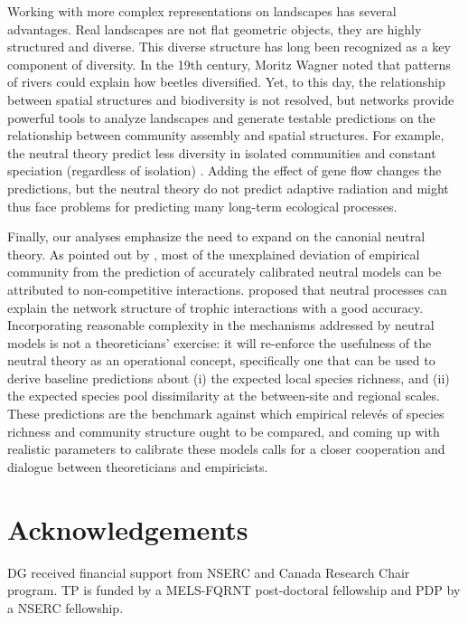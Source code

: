 \documentclass[12pt]{article}
\begin{document}
Working with more complex representations on landscapes has several advantages.
Real landscapes are not flat geometric objects, they are highly structured and
diverse. This diverse structure has long been recognized as a key component of
diversity. In the 19th century, Moritz Wagner noted that patterns of rivers
\cite{coy04} could explain how beetles diversified. Yet, to this day, the
relationship between spatial structures and biodiversity is not resolved, but
networks provide powerful tools to analyze landscapes and generate testable
predictions on the relationship between community assembly and spatial
structures. For example, the neutral theory predict less diversity in isolated
communities and constant speciation (regardless of isolation) \cite{eco08}.
Adding the effect of gene flow changes the predictions, but the neutral theory
do not predict adaptive radiation and might thus face problems for predicting
many long-term ecological processes.

Finally, our analyses emphasize the need to expand on the canonial neutral
theory. As pointed out by \textcite{Wootoon2005}, most of the unexplained
deviation of empirical community from the prediction of accurately calibrated
neutral models can be attributed to non-competitive interactions. \textcite{Canard2012}
proposed that neutral processes can explain the network structure of trophic
interactions with a good accuracy. Incorporating reasonable complexity in the
mechanisms addressed by neutral models is not a theoreticians' exercise: it will
re-enforce the usefulness of the neutral theory as an operational concept,
specifically one that can be used to derive baseline predictions about (i) the
expected local species richness, and (ii) the expected species pool
dissimilarity at the between-site and regional scales. These predictions are the
benchmark against which empirical relev\'es of species richness and community
structure ought to be compared, and coming up with realistic parameters to
calibrate these models calls for a closer cooperation and dialogue between
theoreticians and empiricists.


\section{Acknowledgements}
DG received financial support from NSERC and Canada Research Chair program. TP
is funded by a MELS-FQRNT post-doctoral fellowship and PDP by a NSERC
fellowship.
\newpage
\end{document}
